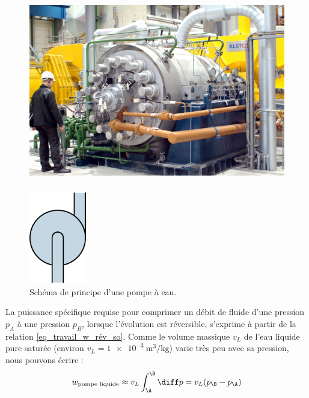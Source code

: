 		\begin{figure}
			\begin{center}
				\includegraphics[height=8cm]{images/centrale_pompe_photo.jpg}
			\end{center}
			\label{fig_centrale_pompe1}
		\end{figure}

		\begin{figure}
			\begin{center}
				\includegraphics[height=4cm]{images/symbole_pompe.png}
			\end{center}
			\caption{Schéma de principe d’une pompe à eau.}
			\label{fig_centrale_pompe2}
		\end{figure}

		La puissance spécifique requise pour comprimer un débit de fluide d’une pression $p_A$ à une pression $p_B$, lorsque l’évolution est réversible, s’exprime à partir de la relation \ref{eq_travail_w_rév_so}. Comme le volume massique $v_L$  de l’eau liquide pure saturée (environ $v_L = \SI{1e-3}{\metre\cubed\per\kilogram}$) varie très peu avec sa pression, nous pouvons écrire :
		\begin{equation}
			{w}_\text{pompe~liquide} \approx v_L \int_\A^\B \diff p = v_L (p_\B - p_\A )
		\end{equation}


